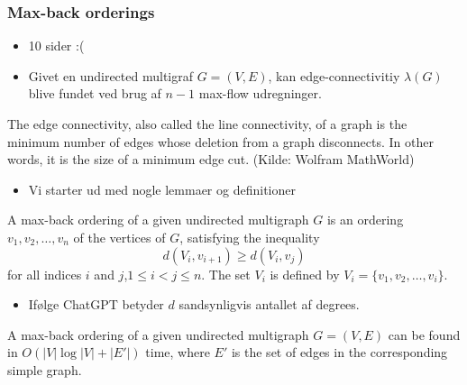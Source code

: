 \documentclass{beamer}
\begin{document}
\begin{frame}[allowframebreaks]
  \frametitle{Max-back orderings}
  \begin{itemize}
  \item 10 sider :(
  \item Givet en undirected multigraf $G = (V,E)$, kan edge-connectivitiy $\lambda(G)$ blive fundet ved brug af $n-1$ max-flow udregninger. 
  \end{itemize}
  \begin{definition}
The edge connectivity, also called the line connectivity, of a graph is the minimum number of edges whose deletion from a graph disconnects. In other words, it is the size of a minimum edge cut. (Kilde: Wolfram MathWorld)
  \end{definition}
  \begin{itemize}
  \item Vi starter ud med nogle lemmaer og definitioner
  \end{itemize}
  \begin{definition}
    A max-back ordering of a given undirected multigraph $G$ is an ordering $v_{1}, v_{2}, \ldots, v_{n}$ of the vertices of $G$, satisfying the inequality
    \[ d(V_{i}, v_{i+1}) \geq d(V_{i}, v_{j}) \]
    for all indices $i$ and $j$,$1 \leq i < j \leq n$. The set $V_{i}$ is defined by $V_{i} = \{v_{1}, v_{2}, \ldots, v_{i}\}$.
  \end{definition}
  \begin{itemize}
  \item Ifølge ChatGPT betyder $d$ sandsynligvis antallet af degrees.
  \end{itemize}
  \begin{lemma}[1]
A max-back ordering of a given undirected multigraph $G = (V,E)$ can be found in $O(|V| \log |V| + |E'|)$ time, where $E'$ is the set of edges in the corresponding simple graph.
  \end{lemma}
\end{frame}
\end{document}
